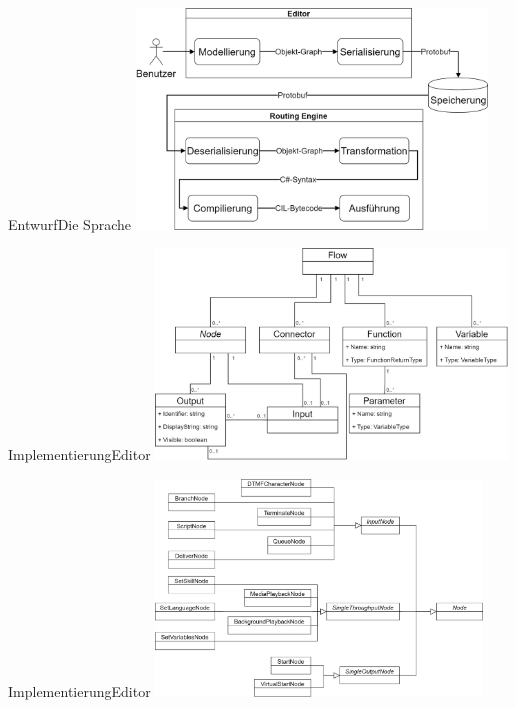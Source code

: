 \documentclass[t,aspectratio=169,divpsnames]{beamer}
\begin{document}
\begin{frame}{Entwurf}{Die Sprache}
{	}
	\only<4>
	{
		\center
		\includegraphics[width=0.7\textwidth]{img/Verarbeitungsschritte.png}
	}
\end{frame}

\begin{frame}{Implementierung}{Editor}
	\center
	\includegraphics[width=0.7\textwidth]{img/FlowClassStructure.png}
\end{frame}

\begin{frame}{Implementierung}{Editor}
	\center
	\includegraphics[width=0.65\textwidth]{img/NodeHierarchy.png}
\end{frame}
\end{document}
